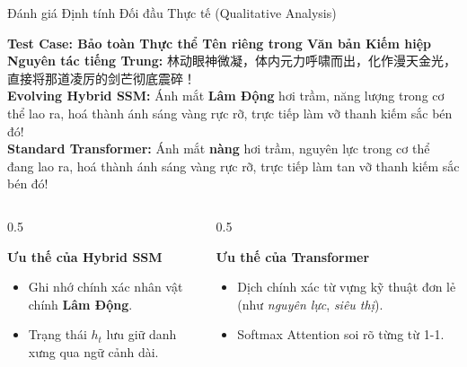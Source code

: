 \documentclass[aspectratio=169, 10pt]{beamer}
\begin{document}
\begin{frame}{Đánh giá Định tính Đối đầu Thực tế (Qualitative Analysis)}
  \begin{block}{\textbf{Test Case: Bảo toàn Thực thể Tên riêng trong Văn bản Kiếm hiệp}}
    \textbf{Nguyên tác tiếng Trung:} {\cjkfont 林动眼神微凝，体内元力呼啸而出，化作漫天金光，直接将那道凌厉的剑芒彻底震碎！}\\[0.1cm]
    \textbf{Evolving Hybrid SSM:} Ánh mắt \textbf{\color{AccentGreen}Lâm Động} hơi trầm, năng lượng trong cơ thể lao ra, hoá thành ánh sáng vàng rực rỡ, trực tiếp làm vỡ thanh kiếm sắc bén đó!\\
    \textbf{Standard Transformer:} Ánh mắt \textbf{\color{AccentRed}nàng} hơi trầm, nguyên lực trong cơ thể đang lao ra, hoá thành ánh sáng vàng rực rỡ, trực tiếp làm tan vỡ thanh kiếm sắc bén đó!
  \end{block}
  \vspace{0.1cm}
  \begin{columns}
    \begin{column}{0.5\textwidth}
      \begin{exampleblock}{\textbf{Ưu thế của Hybrid SSM}}
        \begin{itemize}
          \item Ghi nhớ chính xác nhân vật chính \textbf{Lâm Động}.
          \item Trạng thái $h_t$ lưu giữ danh xưng qua ngữ cảnh dài.
        \end{itemize}
      \end{exampleblock}
    \end{column}
    \begin{column}{0.5\textwidth}
      \begin{block}{\textbf{Ưu thế của Transformer}}
        \begin{itemize}
          \item Dịch chính xác từ vựng kỹ thuật đơn lẻ (như \textit{nguyên lực}, \textit{siêu thị}).
          \item Softmax Attention soi rõ từng từ 1-1.
        \end{itemize}
      \end{block}
    \end{column}
  \end{columns}
\end{frame}
\end{document}
